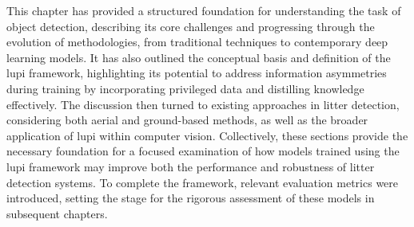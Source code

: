 This chapter has provided a structured foundation for understanding the task of object detection, describing its core challenges and progressing through the evolution of methodologies, from traditional techniques to contemporary deep learning models. It has also outlined the conceptual basis and definition of the \gls{lupi} framework, highlighting its potential to address information asymmetries during training by incorporating privileged data and distilling knowledge effectively. The discussion then turned to existing approaches in litter detection, considering both aerial and ground-based methods, as well as the broader application of \gls{lupi} within computer vision. Collectively, these sections provide the necessary foundation for a focused examination of how models trained using the \gls{lupi} framework may improve both the performance and robustness of litter detection systems. To complete the framework, relevant evaluation metrics were introduced, setting the stage for the rigorous assessment of these models in subsequent chapters.




